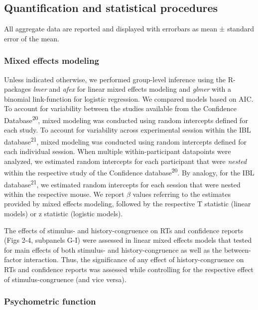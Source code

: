 \documentclass[
]{article}
\begin{document}
\hypertarget{quantification-and-statistical-procedures}{%
\subsection{Quantification and statistical
procedures}\label{quantification-and-statistical-procedures}}

All aggregate data are reported and displayed with errorbars as mean ±
standard error of the mean.

\hypertarget{mixed-effects-modeling}{%
\subsubsection{Mixed effects modeling}\label{mixed-effects-modeling}}

Unless indicated otherwise, we performed group-level inference using the
R-packages \emph{lmer} and \emph{afex} for linear mixed effects modeling
and \emph{glmer} with a binomial link-function for logistic regression.
We compared models based on AIC. To account for variability between the
studies available from the Confidence Database\textsuperscript{20},
mixed modeling was conducted using random intercepts defined for each
study. To account for variability across experimental session within the
IBL database\textsuperscript{21}, mixed modeling was conducted using
random intercepts defined for each individual session. When multiple
within-participant datapoints were analyzed, we estimated random
intercepts for each participant that were \emph{nested} within the
respective study of the Confidence database\textsuperscript{20}. By
analogy, for the IBL database\textsuperscript{21}, we estimated random
intercepts for each session that were nested within the respective
mouse. We report \(\beta\) values referring to the estimates provided by
mixed effects modeling, followed by the respective T statistic (linear
models) or z statistic (logistic models).

The effects of stimulus- and history-congruence on RTs and confidence
reports (Figs 2-4, subpanels G-I) were assessed in linear mixed
effects models that tested for main effects of both stimulus- and
history-congruence as well as the between-factor interaction. Thus, the
significance of any effect of history-congruence on RTs and confidence
reports was assessed while controlling for the respective effect of
stimulus-congruence (and vice versa).

\hypertarget{psychometric-function}{%
\subsubsection{Psychometric function}\label{psychometric-function}}
\end{document}
